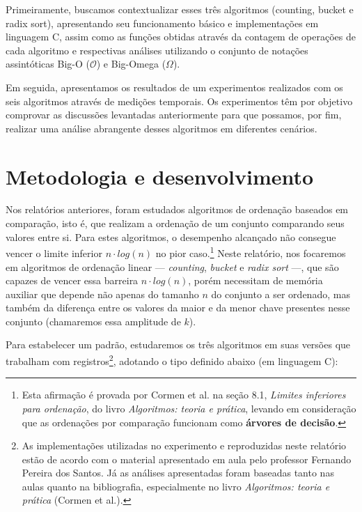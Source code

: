 \documentclass[fontsize=10pt]{article}
\begin{document}
    \quad Primeiramente, buscamos contextualizar esses três algoritmos (counting, bucket e radix sort), apresentando seu funcionamento básico e implementações em linguagem C, assim como as funções obtidas através da contagem de operações de cada algoritmo e respectivas análises utilizando o conjunto de notações assintóticas Big-O ($\mathcal{O}$) e Big-Omega ($\Omega$).
    
    \quad Em seguida, apresentamos os resultados de um experimentos realizados com os seis algoritmos através de medições temporais. Os experimentos têm por objetivo comprovar as discussões levantadas anteriormente para que possamos, por fim, realizar uma análise abrangente desses algoritmos em diferentes cenários.


\section{Metodologia e desenvolvimento}

\quad Nos relatórios anteriores, foram estudados algoritmos de ordenação baseados em comparação, isto é, que realizam a ordenação de um conjunto comparando seus valores entre si. Para estes algoritmos, o desempenho alcançado não consegue vencer o limite inferior $n \cdot log(n)$ no pior caso.\footnote{Esta afirmação é provada por Cormen et al. na seção 8.1, \textit{Limites inferiores para ordenação}, do livro \textit{Algoritmos: teoria e prática}\cite{cormen}, levando em consideração que as ordenações por comparação funcionam como \textbf{árvores de decisão}.} Neste relatório, nos focaremos em algoritmos de ordenação linear — \textit{counting}, \textit{bucket} e \textit{radix sort} —, que são capazes de vencer essa barreira $n \cdot log(n)$, porém necessitam de memória auxiliar que depende não apenas do tamanho $n$ do conjunto a ser ordenado, mas também da diferença entre os valores da maior e da menor chave presentes nesse conjunto (chamaremos essa amplitude de $k$).

\quad Para estabelecer um padrão, estudaremos os três algoritmos em suas versões que trabalham com registros\footnote{As implementações utilizadas no experimento e reproduzidas neste relatório estão de acordo com o material apresentado em aula pelo professor Fernando Pereira dos Santos\cite{lab}. Já as análises apresentadas foram baseadas tanto nas aulas quanto na bibliografia, especialmente no livro \textit{Algoritmos: teoria e prática} (Cormen et al.)\cite{cormen}.}, adotando o tipo definido abaixo (em linguagem C):
\end{document}
